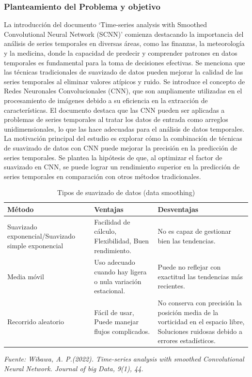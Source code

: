 \subsubsection{Planteamiento del Problema y objetivo }
La introducción del documento `Time-series analysis with Smoothed Convolutional Neural Network (SCNN)' comienza destacando la importancia del análisis de series temporales en diversas áreas, como las finanzas, la meteorología y la medicina, donde la capacidad de predecir y comprender patrones en datos temporales es fundamental para la toma de decisiones efectivas. Se menciona que las técnicas tradicionales de suavizado de datos pueden mejorar la calidad de las series temporales al eliminar valores atípicos y ruido.
Se introduce el concepto de Redes Neuronales Convolucionales (CNN), que son ampliamente utilizadas en el procesamiento de imágenes debido a su eficiencia en la extracción de características. El documento destaca que las CNN pueden ser aplicadas a problemas de series temporales al tratar los datos de entrada como arreglos unidimensionales, lo que las hace adecuadas para el análisis de datos temporales.
La motivación principal del estudio es explorar cómo la combinación de técnicas de suavizado de datos con CNN puede mejorar la precisión en la predicción de series temporales. Se plantea la hipótesis de que, al optimizar el factor de suavizado en CNN, se puede lograr un rendimiento superior en la predicción de series temporales en comparación con otros métodos tradicionales.\\


\begin{table}[H]
	\caption{Tipos de suavizado de datos (data smoothing)}
	\centering
	\begin{tabular}{L{4cm}|L{5cm}|L{5cm}}
		\hline 
		\textbf{Método} & \textbf{Ventajas} & \textbf{Desventajas}\\
		\hline
		Suavizado exponencial/Suavizado simple exponencial & Facilidad de cálculo, Flexibilidad, Buen rendimiento. & No es capaz de gestionar bien las tendencias.  \\
		\hline
		Media móvil & Uso adecuado cuando hay ligera o nula variación estacional. & Puede no reflejar con exactitud las tendencias más recientes.\\
		\hline
		Recorrido aleatorio & Fácil de usar, Puede manejar flujos complicados. & No conserva con precisión la posición media de la vorticidad en el espacio libre, Soluciones ruidosas debido a errores estadísticos.\\
		\hline
	\end{tabular}
	\newline
	\newline \textit{Fuente: Wibawa, A. P.(2022). Time-series analysis with smoothed Convolutional Neural Network. Journal of big Data, 9(1), 44.}
	\label{tab:metodos}
\end{table}


